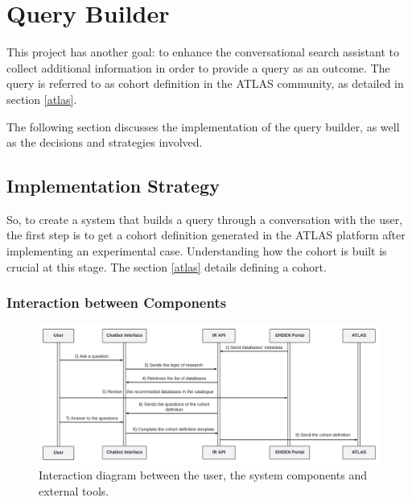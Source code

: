 \chapter{Query Builder}
\label{chapter:QueryBuilder}

This project has another goal: to enhance the conversational search assistant to collect additional information in order to provide a query as an outcome. The query is referred to as cohort definition in the ATLAS community, as detailed in section \ref{atlas}.

The following section discusses the implementation of the query builder, as well as the decisions and strategies involved.


\section{Implementation Strategy}


So, to create a system that builds a query through a conversation with the user, the first step is to get a cohort definition generated in the ATLAS platform after implementing an experimental case. Understanding how the cohort is built is crucial at this stage. The section \ref{atlas} details defining a cohort.


\subsection{Interaction between Components}

\begin{figure}[H]
  \includegraphics[width=\textwidth]{figs/chapter4/interaction_diagram.png}
  \centering
  \caption{Interaction diagram between the user, the system components and external tools.}
  \label{fig_interaction}
\end{figure}



